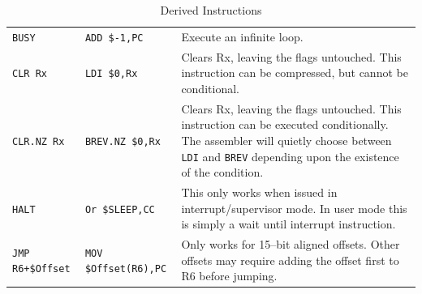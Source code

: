 \documentclass{gqtekspec}
\begin{document}
\begin{table}
\begin{center}
\begin{tabular}{p{1.0in}p{1.5in}p{3in}}
{\tt BUSY } & {\tt ADD \$-1,PC} & Execute an infinite loop.\\
{\tt CLR Rx}
	& {\tt LDI \$0,Rx}
	& Clears Rx, leaving the flags untouched.  This instruction can be
		compressed, but cannot be conditional. \\\hline
{\tt CLR.NZ Rx }
	& {\tt BREV.NZ \$0,Rx}
	& Clears Rx, leaving the flags untouched.  This instruction can be
		executed conditionally. The assembler will quietly choose
		between {\tt LDI} and {\tt BREV} depending upon the existence
		of the condition.\\\hline
{\tt HALT }
	& {\tt Or \$SLEEP,CC}
	& This only works when issued in interrupt/supervisor mode.  In user
	mode this is simply a wait until interrupt instruction.  \\\hline
\hbox{\tt JMP R6+\$Offset}
	& {\tt MOV \$Offset(R6),PC}
	& Only works for 15--bit aligned offsets.  Other offsets may require
		adding the offset first to R6 before jumping.\\\hline
\end{tabular}
\caption{Derived Instructions}\label{tbl:derived-1}
\end{center}\end{table}
\end{document}
